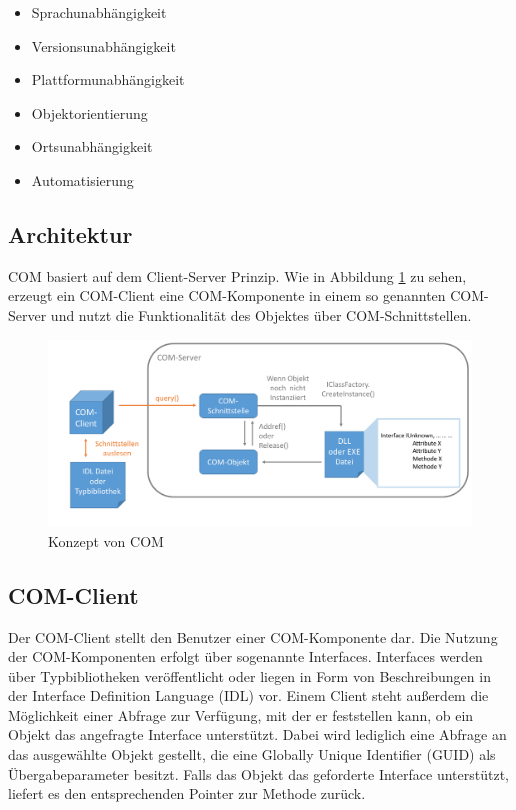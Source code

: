 \begin{itemize}
\item Sprachunabhängigkeit
\item Versionsunabhängigkeit
\item Plattformunabhängigkeit
\item Objektorientierung
\item Ortsunabhängigkeit
\item Automatisierung
\end{itemize} 

\subsection{Architektur}
\label{ch:grundlagen:sec:ComponentObjectModel:subsec:Architektur}

COM basiert auf dem Client-Server Prinzip. Wie in Abbildung \ref{GL_COM} zu sehen, erzeugt ein COM-Client eine COM-Komponente in einem so genannten COM-Server und nutzt die Funktionalität des Objektes über COM-Schnittstellen. 

\begin{figure}[htbp]
	\centering
  \includegraphics[width=1.0\textwidth, width=1.0\textwidth]{pics/Grundlagen_com.pdf}
	\caption{Konzept von COM}
	\label{GL_COM}
\end{figure} 

\subsection{COM-Client}
\label{ch:grundlagen:sec:ComponentObjectModel:subsec:COMClient}

Der COM-Client stellt den Benutzer einer COM-Komponente dar. Die Nutzung der COM-Komponenten erfolgt über sogenannte Interfaces. Interfaces werden über Typbibliotheken veröffentlicht oder liegen in Form von Beschreibungen in der Interface Definition Language (IDL) vor. Einem Client steht außerdem die Möglichkeit einer Abfrage zur Verfügung, mit der er feststellen kann, ob ein Objekt das angefragte Interface unterstützt. Dabei wird lediglich eine Abfrage an das ausgewählte Objekt gestellt, die eine Globally Unique Identifier (GUID) als Übergabeparameter besitzt. Falls das Objekt das geforderte Interface unterstützt, liefert es den entsprechenden Pointer zur Methode zurück.  

